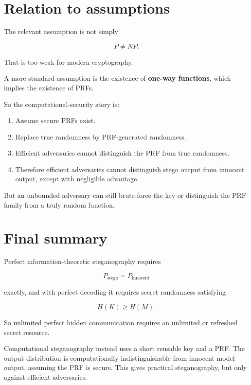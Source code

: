 \documentclass[11pt]{article}
\begin{document}
\section{Relation to assumptions}

\begin{callout}[warning]
\label{co:not-p-vs-np}
The relevant assumption is not simply

\[
P\ne NP.
\]

That is too weak for modern cryptography.
\end{callout}

A more standard assumption is the existence of \textbf{one-way functions}, which implies the existence of PRFs.

So the computational-security story is:

\begin{enumerate}[label=\arabic*.]
    \item Assume secure PRFs exist.
    \item Replace true randomness by PRF-generated randomness.
    \item Efficient adversaries cannot distinguish the PRF from true randomness.
    \item Therefore efficient adversaries cannot distinguish stego output from innocent output, except with negligible advantage.
\end{enumerate}

But an unbounded adversary can still brute-force the key or distinguish the PRF family from a truly random function.

\section{Final summary}

Perfect information-theoretic steganography requires

\[
P_{\text{stego}}=P_{\text{innocent}}
\]

exactly, and with perfect decoding it requires secret randomness satisfying

\[
H(K)\ge H(M).
\]

So unlimited perfect hidden communication requires an unlimited or refreshed secret resource.

Computational steganography instead uses a short reusable key and a PRF. The output distribution is computationally indistinguishable from innocent model output, assuming the PRF is secure. This gives practical steganography, but only against efficient adversaries.
\end{document}

